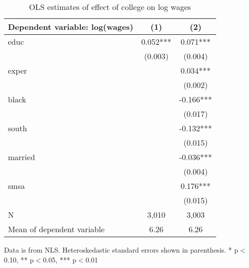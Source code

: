\begin{table}[htbp]\centering
\small
\caption{OLS estimates of effect of college on log wages}
\begin{center}
\begin{threeparttable}
\begin{tabular}{l*{2}{c}}
\toprule
\multicolumn{1}{l}{\textbf{Dependent variable: log(wages)}}&
\multicolumn{1}{c}{\textbf{(1)}}&
\multicolumn{1}{c}{\textbf{(2)}}\\
\midrule
educ                &       0.052***&       0.071***\\
                    &     (0.003)   &     (0.004)   \\
exper               &               &       0.034***\\
                    &               &     (0.002)   \\
black               &               &      -0.166***\\
                    &               &     (0.017)   \\
south               &               &      -0.132***\\
                    &               &     (0.015)   \\
married             &               &      -0.036***\\
                    &               &     (0.004)   \\
smsa                &               &       0.176***\\
                    &               &     (0.015)   \\
\midrule
N                   &       3,010   &       3,003   \\
Mean of dependent variable&        6.26   &        6.26   \\
\bottomrule
\end{tabular}
\begin{tablenotes}
\tiny
\item Data is from NLS.  Heteroskedastic standard errors shown in parenthesis.  * p$<$0.10, ** p$<$0.05, *** p$<$0.01
\end{tablenotes}
\end{threeparttable}
\end{center}
\end{table}

